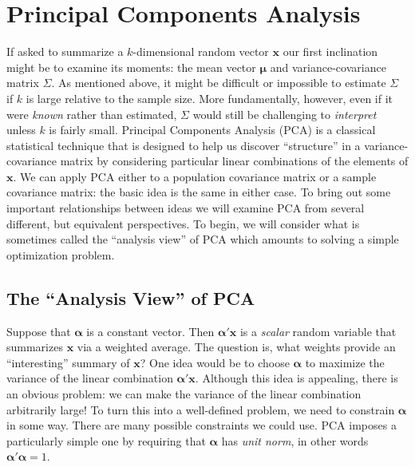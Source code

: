 \section{Principal Components Analysis}
If asked to summarize a $k$-dimensional random vector $\mathbf{x}$ our first inclination might be to examine its moments: the mean vector $\boldsymbol{\mu}$ and variance-covariance matrix $\Sigma$. As mentioned above, it might be difficult or impossible to estimate $\Sigma$ if $k$ is large relative to the sample size. More fundamentally, however, even if it were \emph{known} rather than estimated, $\Sigma$ would still be challenging to \emph{interpret} unless $k$ is fairly small. Principal Components Analysis (PCA) is a classical statistical technique that is designed to help us discover ``structure'' in a variance-covariance matrix by considering particular linear combinations of the elements of $\mathbf{x}$. We can apply PCA either to a population covariance matrix or a sample covariance matrix: the basic idea is the same in either case. To bring out some important relationships between ideas we will examine PCA from several different, but equivalent perspectives. To begin, we will consider what is sometimes called the ``analysis view'' of PCA which amounts to solving a simple optimization problem. 

\subsection{The ``Analysis View'' of PCA}
Suppose that $\boldsymbol{\alpha}$ is a constant vector. Then $\boldsymbol{\alpha}'\mathbf{x}$ is a \emph{scalar} random variable that summarizes $\mathbf{x}$ via a weighted average. The question is, what weights provide an ``interesting'' summary of $\mathbf{x}$? One idea would be to choose $\boldsymbol{\alpha}$ to maximize the variance of the linear combination $\boldsymbol{\alpha}'\mathbf{x}$. Although this idea is appealing, there is an obvious problem: we can make the variance of the linear combination arbitrarily large! To turn this into a well-defined problem, we need to constrain $\boldsymbol{\alpha}$ in some way. There are many possible constraints we could use. PCA imposes a particularly simple one by requiring that $\boldsymbol{\alpha}$ has \emph{unit norm}, in other words $\boldsymbol{\alpha}'\boldsymbol{\alpha} = 1$. 

